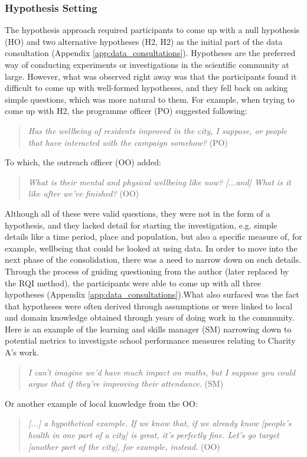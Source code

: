 \subsubsection{Hypothesis Setting}
The hypothesis approach required participants to come up with a null hypothesis (HO) and two alternative hypotheses (H2, H2) as the initial part of the data consultation (Appendix \ref{app:data_consultations}). Hypotheses are the preferred way of conducting experiments or investigations in the scientific community at large. However, what was observed right away was that the participants found it difficult to come up with well-formed hypotheses, and they fell back on asking simple questions, which was more natural to them. For example, when trying to come up with H2, the programme officer (PO) suggested following:
\begin{quote}
    \textit{Has the wellbeing of residents improved in the city, I suppose, or people that have interacted with the campaign somehow?} (PO)
\end{quote}
To which, the outreach officer (OO) added:
\begin{quote}
    \textit{What is their mental and physical wellbeing like now? [...and] What is it like after we've finished?} (OO)
\end{quote}
Although all of these were valid questions, they were not in the form of a hypothesis, and they lacked detail for starting the investigation, e.g. simple details like a time period, place and population, but also a specific measure of, for example, wellbeing that could be looked at using data. In order to move into the next phase of the consolidation, there was a need to narrow down on such details. Through the process of guiding questioning from the author (later replaced by the RQI method), the participants were able to come up with all three hypotheses (Appendix \ref{app:data_consultations}).What also surfaced was the fact that hypotheses were often derived through assumptions or were linked to local and domain knowledge obtained through years of doing work in the community. Here is an example of the learning and skills manager (SM) narrowing down to potential metrics to investigate school performance measures relating to Charity A's work.
\begin{quote}
    \textit{I can't imagine we'd have much impact on maths, but I suppose you could argue that if they're improving their attendance.} (SM)
\end{quote}
Or another example of local knowledge from the OO:
\begin{quote}
    \textit{[...] a hypothetical example. If we know that, if we already know [people's health in one part of a city] is great, it's perfectly fine. Let's go target [another part of the city], for example, instead.} (OO)
\end{quote}
